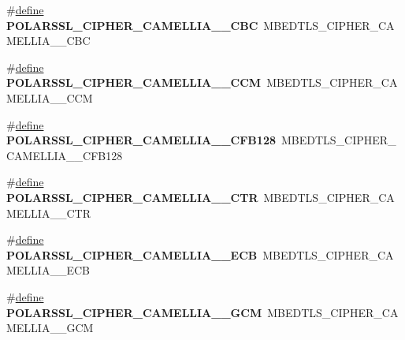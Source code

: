\begin{DoxyCompactItemize}
\item 
\mbox{\label{compat-1_83_8h_a57b97c931d59e381887d2e8b8dc97f86}} 
\#\hyperlink{structdefine}{define} {\bfseries P\+O\+L\+A\+R\+S\+S\+L\+\_\+\+C\+I\+P\+H\+E\+R\+\_\+\+C\+A\+M\+E\+L\+L\+I\+A\+\_\+\_\+\+C\+BC}~M\+B\+E\+D\+T\+L\+S\+\_\+\+C\+I\+P\+H\+E\+R\+\_\+\+C\+A\+M\+E\+L\+L\+I\+A\+\_\+\_\+\+C\+BC
\item 
\mbox{\label{compat-1_83_8h_a04b4c542244fd0685a76f61665e371a6}} 
\#\hyperlink{structdefine}{define} {\bfseries P\+O\+L\+A\+R\+S\+S\+L\+\_\+\+C\+I\+P\+H\+E\+R\+\_\+\+C\+A\+M\+E\+L\+L\+I\+A\+\_\+\_\+\+C\+CM}~M\+B\+E\+D\+T\+L\+S\+\_\+\+C\+I\+P\+H\+E\+R\+\_\+\+C\+A\+M\+E\+L\+L\+I\+A\+\_\+\_\+\+C\+CM
\item 
\mbox{\label{compat-1_83_8h_a819a0df4dcf39977d3db3b7b3ad7b60e}} 
\#\hyperlink{structdefine}{define} {\bfseries P\+O\+L\+A\+R\+S\+S\+L\+\_\+\+C\+I\+P\+H\+E\+R\+\_\+\+C\+A\+M\+E\+L\+L\+I\+A\+\_\+\_\+\+C\+F\+B128}~M\+B\+E\+D\+T\+L\+S\+\_\+\+C\+I\+P\+H\+E\+R\+\_\+\+C\+A\+M\+E\+L\+L\+I\+A\+\_\+\_\+\+C\+F\+B128
\item 
\mbox{\label{compat-1_83_8h_ad5c91e72b6f803442221429e0f543247}} 
\#\hyperlink{structdefine}{define} {\bfseries P\+O\+L\+A\+R\+S\+S\+L\+\_\+\+C\+I\+P\+H\+E\+R\+\_\+\+C\+A\+M\+E\+L\+L\+I\+A\+\_\+\_\+\+C\+TR}~M\+B\+E\+D\+T\+L\+S\+\_\+\+C\+I\+P\+H\+E\+R\+\_\+\+C\+A\+M\+E\+L\+L\+I\+A\+\_\+\_\+\+C\+TR
\item 
\mbox{\label{compat-1_83_8h_ad4857b3de581f3f89244c53e3674140c}} 
\#\hyperlink{structdefine}{define} {\bfseries P\+O\+L\+A\+R\+S\+S\+L\+\_\+\+C\+I\+P\+H\+E\+R\+\_\+\+C\+A\+M\+E\+L\+L\+I\+A\+\_\+\_\+\+E\+CB}~M\+B\+E\+D\+T\+L\+S\+\_\+\+C\+I\+P\+H\+E\+R\+\_\+\+C\+A\+M\+E\+L\+L\+I\+A\+\_\+\_\+\+E\+CB
\item 
\mbox{\label{compat-1_83_8h_a30a5ef5d0a93a2a471d111d8f2d670fe}} 
\#\hyperlink{structdefine}{define} {\bfseries P\+O\+L\+A\+R\+S\+S\+L\+\_\+\+C\+I\+P\+H\+E\+R\+\_\+\+C\+A\+M\+E\+L\+L\+I\+A\+\_\+\_\+\+G\+CM}~M\+B\+E\+D\+T\+L\+S\+\_\+\+C\+I\+P\+H\+E\+R\+\_\+\+C\+A\+M\+E\+L\+L\+I\+A\+\_\+\_\+\+G\+CM
\item 
\mbox{\label{compat-1_83_8h_a0872783881d9d4164011c34619a590ce}} 

\end{DoxyCompactItemize}
